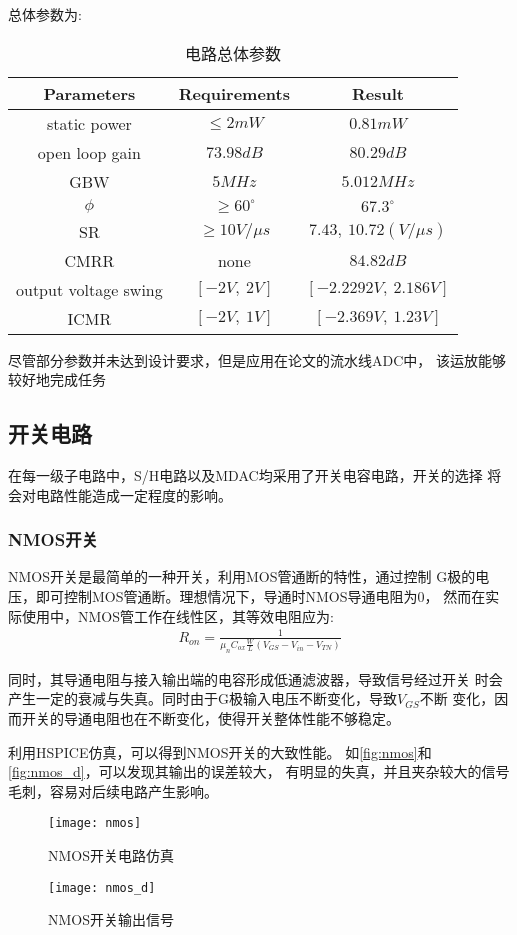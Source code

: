     \indent 总体参数为: \\
    \begin{table}[H]
        \centering
        \begin{tabular}{|c|c|c|}
        \hline
        Parameters & Requirements & Result \\ \hline
        static power & $ \leq 2mW  $ & $ 0.81mW $ \\ \hline
        open loop gain & $ 73.98dB $ & $ 80.29dB $ \\ \hline
        GBW & $ 5MHz $ & $ 5.012MHz $ \\ \hline
        $\phi$ & $ \geq 60^\circ $ & $ 67.3^\circ $ \\ \hline
        SR & $ \geq 10V/\mu s $ & $ 7.43,\ 10.72(V/\mu s) $ \\ \hline
        CMRR & none & $ 84.82dB $ \\ \hline
        output voltage swing & $ [-2V,\ 2V] $ & $ [-2.2292V,\ 2.186V] $ \\ \hline
        ICMR & $ [-2V,\ 1V] $ & $ [-2.369V,\ 1.23V] $ \\ \hline
        \end{tabular}
        \caption{\label{tab:all}电路总体参数}
    \end{table} 
        \indent 尽管部分参数并未达到设计要求，但是应用在论文的流水线ADC中，
        该运放能够较好地完成任务

\subsection{开关电路}
在每一级子电路中，S/H电路以及MDAC均采用了开关电容电路，开关的选择
将会对电路性能造成一定程度的影响。
    \subsubsection{NMOS开关}
    NMOS开关是最简单的一种开关，利用MOS管通断的特性，通过控制
    G极的电压，即可控制MOS管通断。理想情况下，导通时NMOS导通电阻为0，
    然而在实际使用中，NMOS管工作在线性区，其等效电阻应为: 
    \begin{align}
        R_{on} = \frac{1}{\mu_nC_{ox}\frac{W}{L}(V_{GS}-V_{in}-V_{TN})}
    \end{align}
    \par 同时，其导通电阻与接入输出端的电容形成低通滤波器，导致信号经过开关
    时会产生一定的衰减与失真。同时由于G极输入电压不断变化，导致$ V_{GS} $不断
    变化，因而开关的导通电阻也在不断变化，使得开关整体性能不够稳定。
    \par 利用HSPICE仿真，可以得到NMOS开关的大致性能。
    如\autoref{fig:nmos}和\autoref{fig:nmos_d}，可以发现其输出的误差较大，
    有明显的失真，并且夹杂较大的信号毛刺，容易对后续电路产生影响。
    \begin{figure}[H]
        \centering
        \texttt{[image: nmos]}
        \caption{\label{fig:nmos}NMOS开关电路仿真}
    \end{figure}
    \begin{figure}[H]
        \centering
        \texttt{[image: nmos\_d]}
        \caption{\label{fig:nmos_d}NMOS开关输出信号}
    \end{figure}

